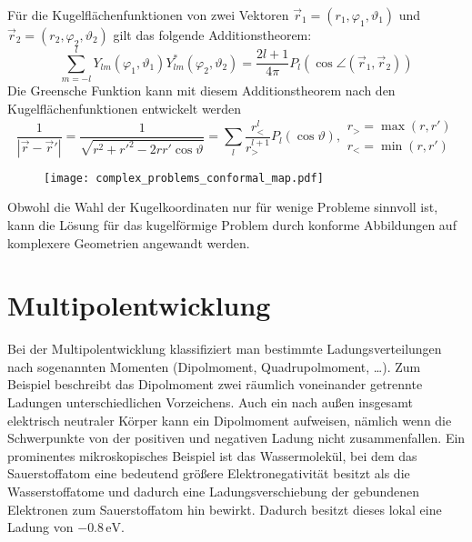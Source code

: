 Für die Kugelflächenfunktionen von zwei Vektoren $\vec {r}_{1}=\left(r_{1},\varphi _{1},\vartheta _{1}\right)$ und $\vec {r}_{2}=\left(r_{2},\varphi _{2},\vartheta _{2}\right)$ gilt das folgende Additionstheorem:
\begin{equation*}
	\sum _{m=-l}^{l}Y_{lm}\left(\varphi _{1},\vartheta _{1}\right)Y_{lm}^{*}\left(\varphi _{2},\vartheta _{2}\right)=\frac{2l+1}{4\pi }P_{l}\left(\cos \angle \left(\vec {r}_{1},\vec {r}_{2}\right)\right)
\end{equation*}
Die Greensche Funktion kann mit diesem Additionstheorem nach den Kugelflächenfunktionen entwickelt werden
\begin{equation*}
	\frac{1}{\left| \vec {r}-\vec {r}'\right| }=\frac{1}{\sqrt{r^{2}+r'^{2}-2rr'\cos \vartheta }}=\sum _{l}\frac{r_{<}^{l}}{r_{>}^{l+1}}P_{l}\left(\cos \vartheta \right), \begin{array}{c}
		r_{>}=\max \left(r,r'\right) \\
		r_{<}=\min \left(r,r'\right)
	\end{array}
\end{equation*}


\begin{figure}[htb]
	\centering
	\texttt{[image: complex\_problems\_conformal\_map.pdf]}
	\caption{}
	\label{fig:complex_problems_conformal_map}
\end{figure}

Obwohl die Wahl der Kugelkoordinaten nur für wenige Probleme sinnvoll ist, kann die Lösung für das kugelförmige Problem durch konforme Abbildungen auf komplexere Geometrien angewandt werden.

\section{Multipolentwicklung\label{ref-032}}

Bei der Multipolentwicklung klassifiziert man bestimmte Ladungsverteilungen nach sogenannten Momenten (Dipolmoment, Quadrupolmoment, {\ldots}). Zum Beispiel beschreibt das Dipolmoment zwei räumlich voneinander getrennte Ladungen unterschiedlichen Vorzeichens. Auch ein nach außen insgesamt elektrisch neutraler Körper kann ein Dipolmoment aufweisen, nämlich wenn die Schwerpunkte von der positiven und negativen Ladung nicht zusammenfallen. Ein prominentes mikroskopisches Beispiel ist das Wassermolekül, bei dem das Sauerstoffatom eine bedeutend größere Elektronegativität besitzt als die Wasserstoffatome und dadurch eine Ladungsverschiebung der gebundenen Elektronen zum Sauerstoffatom hin bewirkt. Dadurch besitzt dieses lokal eine Ladung von $-0.8\,\mathrm{eV}$.

